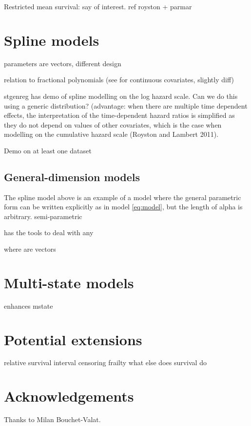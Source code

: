 \documentclass[nojss,nofooter]{jss}\usepackage[]{graphicx}\usepackage[]{color}
\begin{document}
Restricted mean survival: say of interest. ref royston + parmar


\section{Spline models}

parameters are vectors, different design

relation to fractional polynomials 
(see  for continuous covariates, slightly diff)

stgenreg has demo of spline modelling on the log hazard scale.  Can we do this using a generic distribution? 
(advantage: when there are multiple time dependent effects, the
interpretation of the time-dependent hazard ratios is simplified as
they do not depend on values of other covariates, which is the case
when modelling on the cumulative hazard scale (Royston and Lambert
2011).

Demo on at least one dataset 

\subsection{General-dimension models}
\label{sec:gdim}

The spline model above is an example of a model where the general
parametric form can be written explicitly as in model \ref{eq:model},
but the length of alpha is arbitrary.  semi-parametric 

 has the tools to deal with any 

where are vectors



\section{Multi-state models}

enhances mstate

\section{Potential extensions}

relative survival
interval censoring
frailty 
what else does survival do 


\appendix
\section{Acknowledgements}
Thanks to Milan Bouchet-Valat.


\end{document}
